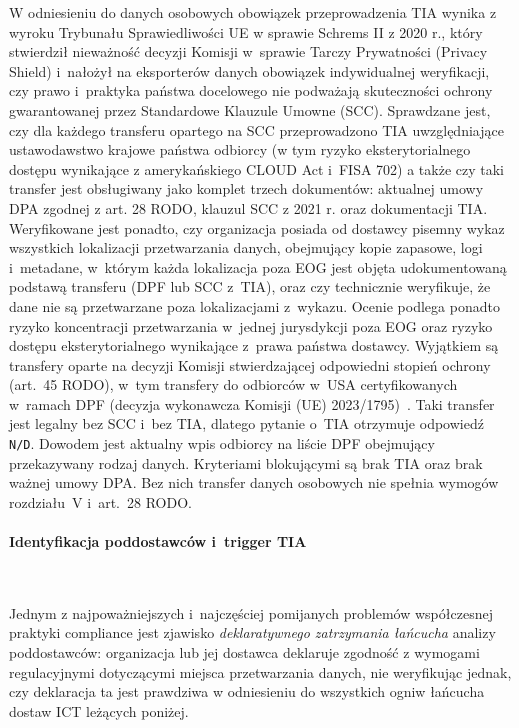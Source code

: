 W odniesieniu do danych osobowych obowiązek przeprowadzenia TIA wynika z wyroku Trybunału Sprawiedliwości UE w sprawie Schrems II z 2020 r., który stwierdził nieważność decyzji Komisji w~sprawie Tarczy Prywatności (Privacy Shield) i~nałożył na eksporterów danych obowiązek indywidualnej weryfikacji, czy prawo i~praktyka państwa docelowego nie podważają skuteczności ochrony gwarantowanej przez Standardowe Klauzule Umowne (SCC). Sprawdzane jest, czy dla każdego transferu opartego na SCC przeprowadzono TIA uwzględniające ustawodawstwo krajowe państwa odbiorcy (w tym ryzyko eksterytorialnego dostępu wynikające z amerykańskiego CLOUD Act i~FISA 702) a także czy taki transfer jest obsługiwany jako komplet trzech dokumentów: aktualnej umowy DPA zgodnej z art. 28 RODO, klauzul SCC z 2021 r. oraz dokumentacji TIA. Weryfikowane jest ponadto, czy organizacja posiada od dostawcy pisemny wykaz wszystkich lokalizacji przetwarzania danych, obejmujący kopie zapasowe, logi i~metadane, w~którym każda lokalizacja poza EOG jest objęta udokumentowaną podstawą transferu (DPF lub SCC z~TIA), oraz czy technicznie weryfikuje, że dane nie są przetwarzane poza lokalizacjami z~wykazu. Ocenie podlega ponadto ryzyko koncentracji przetwarzania w~jednej jurysdykcji poza EOG oraz ryzyko dostępu eksterytorialnego wynikające z~prawa państwa dostawcy. Wyjątkiem są transfery oparte na decyzji Komisji stwierdzającej odpowiedni stopień ochrony (art.~45 RODO), w~tym transfery do odbiorców w~USA certyfikowanych w~ramach DPF (decyzja wykonawcza Komisji (UE) 2023/1795)~\autocite{KomisjaEuropejska2023DPF}. Taki transfer jest legalny bez SCC i~bez TIA, dlatego pytanie o~TIA otrzymuje odpowiedź \texttt{N/D}. Dowodem jest aktualny wpis odbiorcy na liście DPF obejmujący przekazywany rodzaj danych. Kryteriami blokującymi są brak TIA oraz brak ważnej umowy DPA. Bez nich transfer danych osobowych nie spełnia wymogów rozdziału~V i~art.~28 RODO.

\paragraph{Identyfikacja poddostawców i~trigger TIA}\mbox{}\\
\label{sec:trigger-tia}

Jednym z najpoważniejszych i~najczęściej pomijanych problemów współczesnej praktyki compliance jest zjawisko \textit{deklaratywnego zatrzymania łańcucha} analizy poddostawców: 
organizacja lub jej dostawca deklaruje zgodność z wymogami regulacyjnymi dotyczącymi miejsca przetwarzania danych, nie weryfikując jednak,
czy deklaracja ta jest prawdziwa w odniesieniu do wszystkich ogniw łańcucha dostaw ICT leżących poniżej.

